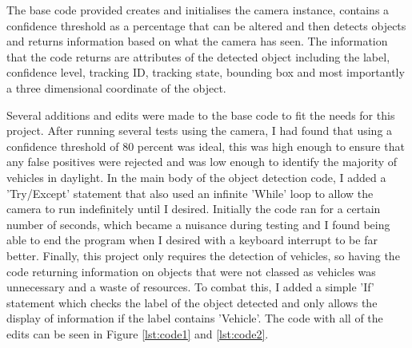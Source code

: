 \documentclass{l4proj}
\begin{document}
The base code provided creates and initialises the camera instance, contains a confidence threshold as a percentage that can be altered and then detects objects and returns information based on what the camera has seen. The information that the code returns are attributes of the detected object including the label, confidence level, tracking ID, tracking state, bounding box and most importantly a three dimensional coordinate of the object.

Several additions and edits were made to the base code to fit the needs for this project. After running several tests using the camera, I had found that using a confidence threshold of 80 percent was ideal, this was high enough to ensure that any false positives were rejected and was low enough to identify the majority of vehicles in daylight. In the main body of the object detection code, I added a 'Try/Except' statement that also used an infinite 'While' loop to allow the camera to run indefinitely until I desired. Initially the code ran for a certain number of seconds, which became a nuisance during testing and I found being able to end the program when I desired with a keyboard interrupt to be far better. Finally, this project only requires the detection of vehicles, so having the code returning information on objects that were not classed as vehicles was unnecessary and a waste of resources. To combat this, I added a simple 'If' statement which checks the label of the object detected and only allows the display of information if the label contains 'Vehicle'. The code with all of the edits can be seen in Figure \ref{lst:code1} and \ref{lst:code2}.
\end{document}

